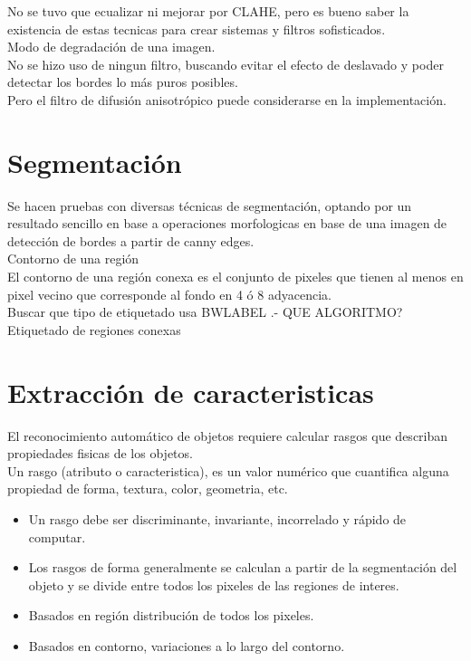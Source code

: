 \documentclass[a4paper, 11pt]{article}
\begin{document}
No se tuvo que ecualizar ni mejorar por CLAHE, pero es bueno saber la existencia de estas tecnicas para crear sistemas y filtros sofisticados.\\

Modo de degradación de una imagen.\\

No se hizo uso de ningun filtro, buscando evitar el efecto de deslavado y poder detectar los bordes lo más puros posibles.\\

Pero el filtro de difusión anisotrópico puede considerarse en la implementación.\\

\section{Segmentación}

Se hacen pruebas con diversas técnicas de segmentación, optando por un resultado sencillo en base a operaciones morfologicas en base de una imagen de detección de bordes a partir de canny edges.\\

Contorno de una región\\

El contorno de una región conexa es el conjunto de pixeles que tienen al menos en pixel vecino que corresponde al fondo en 4 ó 8 adyacencia.\\

Buscar que tipo de etiquetado usa BWLABEL .- QUE ALGORITMO?\\

Etiquetado de regiones conexas\\


\pagebreak
\section{Extracción de caracteristicas}

El reconocimiento automático de objetos requiere calcular rasgos que describan propiedades fisicas de los objetos.\\

Un rasgo (atributo o caracteristica), es un valor numérico que cuantifica alguna propiedad de forma, textura, color, geometria, etc.

\begin{itemize}
\item Un rasgo debe ser discriminante, invariante, incorrelado y rápido de computar.
\item Los rasgos de forma generalmente se calculan a partir de la segmentación del objeto y se divide entre todos los pixeles de las regiones de interes.
\item Basados en región distribución de todos los pixeles.
\item Basados en contorno, variaciones a lo largo del contorno.
\end{itemize}
\end{document}

